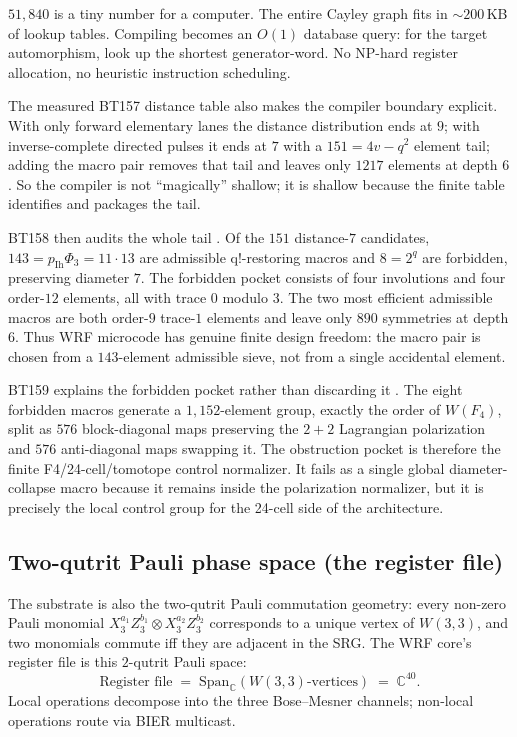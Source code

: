 \documentclass[11pt,letterpaper]{article}
\theoremstyle{remark}
\newcommand{\W}{W(3,3)}
\newcommand{\CC}{\mathbb{C}}
\begin{document}
\begin{intuition}[Why $|G| = 51{,}840$ is small]
$51{,}840$ is a tiny number for a computer. The entire Cayley graph fits in $\sim 200$\,KB
of lookup tables. Compiling becomes an $O(1)$ database query: for the target
automorphism, look up the shortest generator-word. No NP-hard register allocation, no
heuristic instruction scheduling.
\end{intuition}

The measured BT157 distance table also makes the compiler boundary explicit. With only
forward elementary lanes the distance distribution ends at $9$; with inverse-complete
directed pulses it ends at $7$ with a $151=4v-q^2$ element tail; adding the macro pair
removes that tail and leaves only $1217$ elements at depth $6$. So the compiler is not
``magically'' shallow; it is shallow because the finite table identifies and packages the
tail.

BT158 then audits the whole tail \cite{wrf-bt158}. Of the $151$ distance-$7$ candidates,
$143=p_{\mathrm{Ih}}\Phi_3=11\cdot13$ are admissible q!-restoring macros and
$8=2^q$ are forbidden, preserving diameter $7$. The forbidden pocket consists of four
involutions and four order-$12$ elements, all with trace $0$ modulo $3$. The two most
efficient admissible macros are both order-$9$ trace-$1$ elements and leave only $890$
symmetries at depth $6$. Thus WRF microcode has genuine finite design freedom: the macro
pair is chosen from a $143$-element admissible sieve, not from a single accidental element.

BT159 explains the forbidden pocket rather than discarding it \cite{wrf-bt159}. The eight
forbidden macros generate a $1{,}152$-element group, exactly the order of $W(F_4)$, split as
$576$ block-diagonal maps preserving the $2+2$ Lagrangian polarization and $576$
anti-diagonal maps swapping it. The obstruction pocket is therefore the finite
F4/24-cell/tomotope control normalizer. It fails as a single global diameter-collapse
macro because it remains inside the polarization normalizer, but it is precisely the
local control group for the 24-cell side of the architecture.

\subsection{Two-qutrit Pauli phase space (the register file)}

The substrate is also the two-qutrit Pauli commutation geometry: every non-zero Pauli
monomial $X_3^{a_1}Z_3^{b_1} \otimes X_3^{a_2}Z_3^{b_2}$ corresponds to a unique vertex of
$\W$, and two monomials commute iff they are adjacent in the SRG. The WRF core's
register file is this $2$-qutrit Pauli space:
\[
\text{Register file} \;=\; \mathrm{Span}_\CC(\W\text{-vertices}) \;=\; \CC^{40}.
\]
Local operations decompose into the three Bose--Mesner channels; non-local operations
route via BIER multicast.
\end{document}
